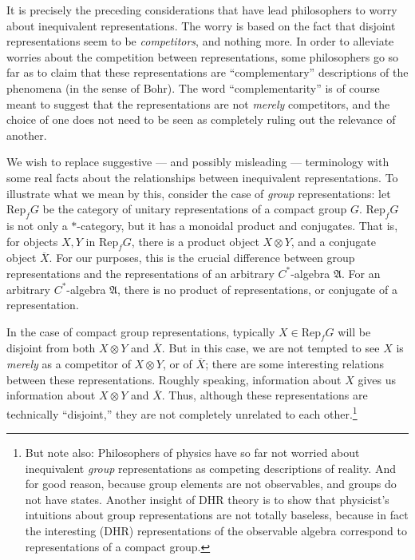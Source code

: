 \documentclass[11pt]{article}
\theoremstyle{definition}
\theoremstyle{definition}
\theoremstyle{remark}
\def\ol#1{{\overline #1}}
\def\al#1{{\mathfrak #1}}
\newcommand{\Rep}{\mathrm{Rep}}
\begin{document}
It is precisely the preceding considerations that have lead
philosophers to worry about inequivalent representations.  The worry
is based on the fact that disjoint representations seem to be
\emph{competitors}, and nothing more.  In order to alleviate worries
about the competition between representations, some philosophers
\cite{rindler,hans} go so far as to claim that these representations
are ``complementary'' descriptions of the phenomena (in the sense of
Bohr).  The word ``complementarity'' is of course meant to suggest
that the representations are not \emph{merely} competitors, and the
choice of one does not need to be seen as completely ruling out the
relevance of another.

We wish to replace suggestive --- and possibly misleading ---
terminology with some real facts about the relationships between
inequivalent representations.  To illustrate what we mean by this,
consider the case of \emph{group} representations: let $\Rep _fG$ be
the category of unitary representations of a compact group $G$.  $\Rep
_fG$ is not only a $*$-category, but it has a monoidal product and
conjugates.  That is, for objects $X,Y$ in $\Rep _fG$, there is a
product object $X\otimes Y$, and a conjugate object $\ol X$.  For our
purposes, this is the crucial difference between group representations
and the representations of an arbitrary $C^*$-algebra $\al A$.  For an
arbitrary $C^*$-algebra $\al A$, there is no product of
representations, or conjugate of a representation.  

In the case of compact group representations, typically $X\in \Rep
_fG$ will be disjoint from both $X\otimes Y$ and $\ol X$.  But in this
case, we are not tempted to see $X$ is \emph{merely} as a competitor
of $X\otimes Y$, or of $\ol X$; there are some interesting relations
between these representations.  Roughly speaking, information about
$X$ gives us information about $X\otimes Y$ and $\ol X$.  Thus,
although these representations are technically ``disjoint,'' they are
not completely unrelated to each other.\footnote{But note also:
  Philosophers of physics have so far not worried about inequivalent
  \emph{group} representations as competing descriptions of reality.
  And for good reason, because group elements are not observables, and
  groups do not have states.  Another insight of DHR theory is to show
  that physicist's intuitions about group representations are not
  totally baseless, because in fact the interesting (DHR)
  representations of the observable algebra correspond to
  representations of a compact group.}
\end{document}
